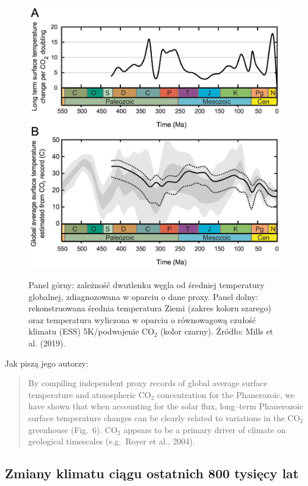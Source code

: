 \documentclass[12pt]{article}
\begin{document}
\begin{figure}
	\centering
	\includegraphics[width=.95\textwidth]{img/phan2019.png}	
	
	\smallskip\noindent\small Panel górny: zależność dwutlenku węgla od średniej temperatury globalnej, zdiagnozowana w oparciu o dane proxy. Panel dolny: rekonstruowana średnia temperatura Ziemi (zakres koloru szarego) oraz temperatura wyliczona w oparciu o równowagową czułość klimatu (ESS) 5K/podwojenie CO$_2$ (kolor czarny). Źródło: Mills et al. (2019).
\end{figure}

Jak piszą jego autorzy:

\begin{quotation}
	By compiling independent proxy records of global average surface temperature and atmospheric CO$_2$ concentration for the Phanerozoic, we have shown that when accounting for the solar flux, long--term Phanerozoic surface temperature changes can be clearly related to variations in the CO$_2$ greenhouse (Fig.~6). CO$_2$ appears to be a primary driver of climate on geological timescales (e.g.~Royer et al., 2004).
\end{quotation}		

\newpage

\subsection*{Zmiany klimatu ciągu ostatnich 800 tysięcy lat}
\end{document}
